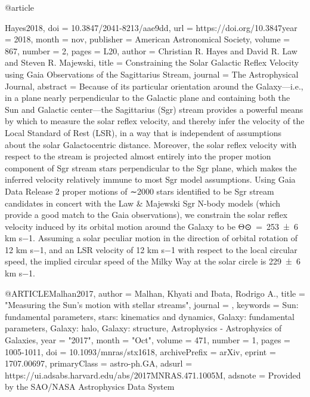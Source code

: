 \documentclass[apj]{emulateapj}
\begin{document}
{{{{{{{{@article{Hayes2018,
	doi = {10.3847/2041-8213/aae9dd},
	url = {https://doi.org/10.3847year = 2018,
	month = {nov},
	publisher = {American Astronomical Society},
	volume = {867},
	number = {2},
	pages = {L20},
	author = {Christian R. Hayes and David R. Law and Steven R. Majewski},
	title = {Constraining the Solar Galactic Reflex Velocity using Gaia Observations of the Sagittarius Stream},
	journal = {The Astrophysical Journal},
	abstract = {Because of its particular orientation around the Galaxy—i.e., in a plane nearly perpendicular to the Galactic plane and containing both the Sun and Galactic center—the Sagittarius (Sgr) stream provides a powerful means by which to measure the solar reflex velocity, and thereby infer the velocity of the Local Standard of Rest (LSR), in a way that is independent of assumptions about the solar Galactocentric distance. Moreover, the solar reflex velocity with respect to the stream is projected almost entirely into the proper motion component of Sgr stream stars perpendicular to the Sgr plane, which makes the inferred velocity relatively immune to most Sgr model assumptions. Using Gaia Data Release 2 proper motions of ∼2000 stars identified to be Sgr stream candidates in concert with the Law & Majewski Sgr N-body models (which provide a good match to the Gaia observations), we constrain the solar reflex velocity induced by its orbital motion around the Galaxy to be Θ⊙ = 253 ± 6 km s−1. Assuming a solar peculiar motion in the direction of orbital rotation of 12 km s−1, and an LSR velocity of 12 km s−1 with respect to the local circular speed, the implied circular speed of the Milky Way at the solar circle is 229 ± 6 km s−1.}
}

@ARTICLE{Malhan2017,
       author = {{Malhan}, Khyati and {Ibata}, Rodrigo A.},
        title = "{Measuring the Sun's motion with stellar streams}",
      journal = {\mnras},
     keywords = {Sun: fundamental parameters, stars: kinematics and dynamics, Galaxy: fundamental parameters, Galaxy: halo, Galaxy: structure, Astrophysics - Astrophysics of Galaxies},
         year = "2017",
        month = "Oct",
       volume = {471},
       number = {1},
        pages = {1005-1011},
          doi = {10.1093/mnras/stx1618},
archivePrefix = {arXiv},
       eprint = {1707.00697},
 primaryClass = {astro-ph.GA},
       adsurl = {https://ui.adsabs.harvard.edu/abs/2017MNRAS.471.1005M},
      adsnote = {Provided by the SAO/NASA Astrophysics Data System}
}



}}}}}}}}}
\end{document}
